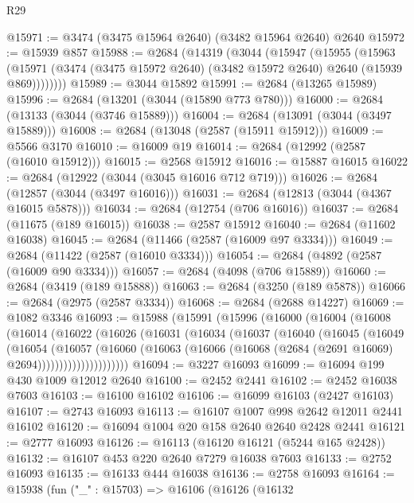 \begin{lexlean}{R29}
\begin{coremodule}
@15971 := @3474 (@3475 @15964 @2640) (@3482 @15964 @2640) @2640
@15972 := @15939 @857
@15988 := @2684
    (@14319
      (@3044
        (@15947
          (@15955
            (@15963
              (@15971 (@3474 (@3475 @15972 @2640) (@3482 @15972 @2640) @2640 (@15939 @869))))))))
@15989 := @3044 @15892
@15991 := @2684 (@13265 @15989)
@15996 := @2684 (@13201 (@3044 (@15890 @773 @780)))
@16000 := @2684 (@13133 (@3044 (@3746 @15889)))
@16004 := @2684 (@13091 (@3044 (@3497 @15889)))
@16008 := @2684 (@13048 (@2587 (@15911 @15912)))
@16009 := @5566 @3170
@16010 := @16009 @19
@16014 := @2684 (@12992 (@2587 (@16010 @15912)))
@16015 := @2568 @15912
@16016 := @15887 @16015
@16022 := @2684 (@12922 (@3044 (@3045 @16016 @712 @719)))
@16026 := @2684 (@12857 (@3044 (@3497 @16016)))
@16031 := @2684 (@12813 (@3044 (@4367 @16015 @5878)))
@16034 := @2684 (@12754 (@706 @16016))
@16037 := @2684 (@11675 (@189 @16015))
@16038 := @2587 @15912
@16040 := @2684 (@11602 @16038)
@16045 := @2684 (@11466 (@2587 (@16009 @97 @3334)))
@16049 := @2684 (@11422 (@2587 (@16010 @3334)))
@16054 := @2684 (@4892 (@2587 (@16009 @90 @3334)))
@16057 := @2684 (@4098 (@706 @15889))
@16060 := @2684 (@3419 (@189 @15888))
@16063 := @2684 (@3250 (@189 @5878))
@16066 := @2684 (@2975 (@2587 @3334))
@16068 := @2684 (@2688 @14227)
@16069 := @1082 @3346
@16093 := @15988
    (@15991
      (@15996
        (@16000
          (@16004
            (@16008
              (@16014
                (@16022
                  (@16026
                    (@16031
                      (@16034
                        (@16037
                          (@16040
                            (@16045
                              (@16049
                                (@16054
                                  (@16057
                                    (@16060
                                      (@16063
                                        (@16066
                                          (@16068 (@2684 (@2691 @16069) @2694)))))))))))))))))))))
@16094 := @3227 @16093
@16099 := @16094 @199 @430 @1009 @12012 @2640
@16100 := @2452 @2441
@16102 := @2452 @16038 @7603
@16103 := @16100 @16102
@16106 := @16099 @16103 (@2427 @16103)
@16107 := @2743 @16093
@16113 := @16107 @1007 @998 @2642 @12011 @2441 @16102
@16120 := @16094 @1004 @20 @158 @2640 @2640 @2428 @2441
@16121 := @2777 @16093
@16126 := @16113 (@16120 @16121 (@5244 @165 @2428))
@16132 := @16107 @453 @220 @2640 @7279 @16038 @7603
@16133 := @2752 @16093
@16135 := @16133 @444 @16038
@16136 := @2758 @16093
@16164 := @15938
    (fun ("_" : @15703) =>
    @16106
      (@16126
        (@16132

\end{coremodule}
\end{lexlean}
